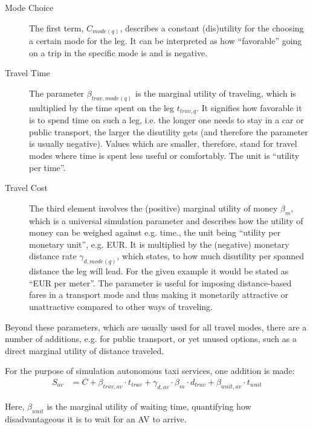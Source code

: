 \begin{description}

\item[Mode Choice] The first term, $C_{mode(q)}$, describes a constant (dis)utility for the
choosing a certain mode for the leg. It can be interpreted as how ``favorable''
going on a trip in the specific mode is and is negative.

\item[Travel Time] The parameter $\beta_{trav,mode(q)}$ is the marginal utility of traveling,
which is multiplied by the time spent on the leg $t_{trav,q}$. It signifies how
favorable it is to spend time on such a leg, i.e. the longer one needs to stay
in a car or public transport, the larger the disutility gets (and therefore
the parameter is usually negative). Values which are smaller, therefore,
stand for travel modes where time is spent less useful or comfortably. The unit is
``utility per time''.

\item[Travel Cost] The third element involves the (positive) marginal utility of money $\beta_{m}$,
which is a universal simulation parameter and describes how the utility of money can
be weighed against e.g. time., the unit being ``utility per monetary unit'', e.g. EUR.
It is multiplied by the (negative) monetary distance rate
$\gamma_{d,mode(q)}$, which states, to how much disutility per spanned
distance the leg will lead. For the given example it would be stated as ``EUR per meter''.
The parameter is useful for imposing distance-based
fares in a transport mode and thus making it monetarily attractive or
unattractive compared to other ways of traveling.

\end{description}

Beyond these parameters, which are usually used for all travel modes, there are
a number of additions, e.g. for public transport, or yet unused options, such
as a direct marginal utility of distance traveled.

For the purpose of simulation autonomous taxi services, one addition is made:
\begin{equation}\begin{aligned}
S_{av} &= C + \beta_{trav,av} \cdot t_{trav} + \gamma_{d,av} \cdot \beta_m \cdot d_{trav} + \beta_{wait,av} \cdot t_{wait}
\end{aligned}\end{equation}

Here, $\beta_{wait}$ is the marginal utility of waiting time, quantifying
how disadvantageous it is to wait for an AV to arrive.

